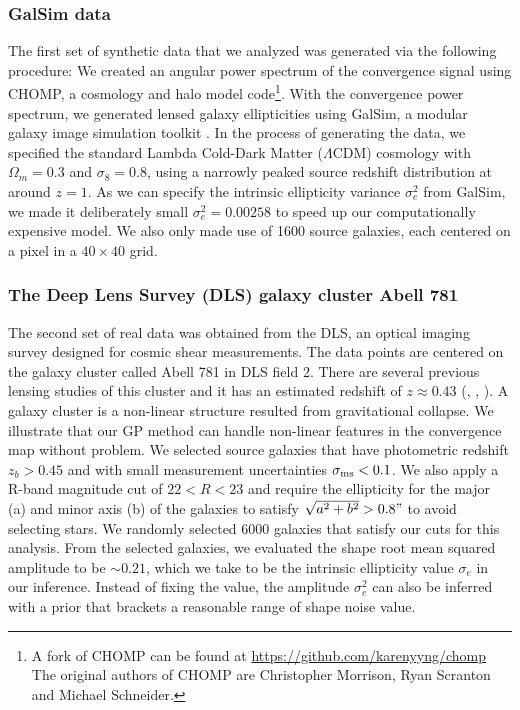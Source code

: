 \subsubsection{{\sc GalSim} data}
The first set of synthetic data that we analyzed was generated via the following procedure: 
We created an angular power spectrum of the convergence signal using {\sc
CHOMP}, a cosmology and halo model code\footnote{A fork of {\sc CHOMP} can be
found at \href{https://github.com/karenyyng/chomp}{https://github.com/karenyyng/chomp}
The original authors of CHOMP are Christopher Morrison, Ryan Scranton and Michael Schneider.
}. 
With the convergence power spectrum, we generated lensed   
galaxy ellipticities using {\sc GalSim}, a modular galaxy image
simulation toolkit \citep{Rowe2015}.
In the process of generating the data, we specified 
the standard Lambda Cold-Dark Matter ($\Lambda$CDM) cosmology with $\Omega_m =
0.3$ and $\sigma_8 = 0.8$, using a narrowly peaked source redshift distribution
at around $z = 1$. As we can specify the intrinsic ellipticity variance
$\sigma_e^2$ from {\sc GalSim}, we made it deliberately small $\sigma_e^2 =
0.00258$ to speed up our computationally expensive model. 
We also only made use of 1600 source galaxies, each centered on a pixel in a 
$40 \times 40$ grid. 
 
\subsubsection{The Deep Lens Survey (DLS) galaxy cluster Abell 781}
The second set of real data was obtained from the DLS, an optical imaging survey 
designed for cosmic shear measurements.  The data points
are centered on the galaxy cluster called Abell 781 in DLS field 2.
There are several previous lensing studies of this cluster and it has an estimated redshift
of $z \approx 0.43$ (\citealt{Wittman2014}, \citealt{Cook2012}, \citealt{Sehgal2008}). 
A galaxy cluster is a
non-linear structure resulted from gravitational collapse. We illustrate that
our GP method can handle non-linear features in the convergence map without 
problem. We selected source galaxies that have photometric redshift $z_b >
0.45$ and with small measurement uncertainties $\sigma_{\rm ms} < 0.1$. We also apply  
a R-band magnitude cut of $22 < R < 23$ and require the ellipticity for the
major (a) and minor axis (b) of the galaxies to satisfy $\sqrt{a^2 + b^2} > 0.8"$ 
to avoid selecting stars. We randomly selected 6000 galaxies that satisfy our
cuts for this analysis. From the selected galaxies, we evaluated the shape
root mean squared amplitude to be $\sim 0.21$, which we take to be the
intrinsic ellipticity value $\sigma_e$ in our inference.
Instead of fixing the value, the amplitude
$\sigma_e^2$ can also be inferred with a prior that brackets a reasonable range of
shape noise value.  
 
